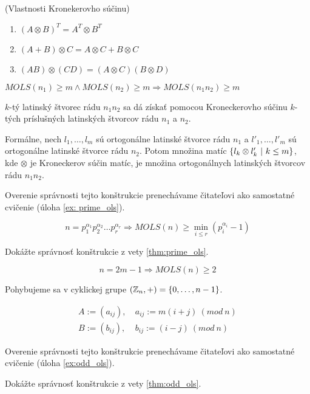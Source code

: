 \begin{toreview}
\begin{theorem}{(Vlastnosti Kronekerovho súčinu)}
\label{th:kr_formulas}
\begin{enumerate}
    \item $(A \otimes B)^T = A^T \otimes B^T$
    \item $(A + B) \otimes C = A \otimes C + B \otimes C$
    \item $(A B) \otimes (C D) = (A \otimes C)(B \otimes D)$
\end{enumerate}
\end{theorem}

\end{toreview}

\begin{theorem}
\label{thm:prime_ols}
$MOLS(n_1) \geq m \wedge MOLS(n_2) \geq m \Rightarrow MOLS(n_1 n_2) \geq m$
\end{theorem}

\begin{construction}
$k$-tý latinský štvorec rádu $n_1 n_2$ sa dá získať pomocou Kroneckerovho súčinu $k$-tých príslušných latinských štvorcov rádu $n_1$ a $n_2$.

Formálne, nech $l_1, \ldots, l_m$ sú ortogonálne latinské štvorce rádu $n_1$ a $l'_1, \ldots, l'_m$ sú ortogonálne latinské štvorce rádu $n_2$.
Potom množina matíc $\left\{l_k \otimes l'_k ~|~ k \leq m\right\}$, kde $\otimes$ je Kroneckerov súčin matíc, je množina ortogonálnych latinských štvorcov rádu $n_1 n_2$.

Overenie správnosti tejto konštrukcie prenechávame čitateľovi ako samostatné cvičenie (úloha \ref{ex: prime_ols}).
\end{construction}

\begin{corollary}
$$n = p_1^{\alpha_1} p_2^{\alpha_2} \ldots p_r^{\alpha_r} \Rightarrow MOLS(n) \geq \min_{i \leq r} (p_i^{\alpha_i} - 1)$$
\end{corollary}


\begin{exercise}
\label{ex: prime_ols}
Dokážte správnosť konštrukcie z vety \ref{thm:prime_ols}.
\end{exercise}


\begin{theorem}
\label{thm:odd_ols}
$$n = 2m - 1 \Rightarrow MOLS(n) \geq 2$$
\end{theorem}

\begin{construction}

Pohybujeme sa v cyklickej grupe $(\mathbb{Z}_n, +) = \left\{0, \ldots, n-1\right\}$.

\begin{align*}
A := (a_{ij}),~& a_{ij} := m (i+j)~(mod~n) \\
B := (b_{ij}),~& b_{ij} := (i-j)  ~(mod~n)    
\end{align*}

Overenie správnosti tejto konštrukcie prenechávame čitateľovi ako samostatné cvičenie (úloha \ref{ex:odd_ols}).
\end{construction}


\begin{exercise}
\label{ex:odd_ols}
Dokážte správnosť konštrukcie z vety \ref{thm:odd_ols}.
\end{exercise}
